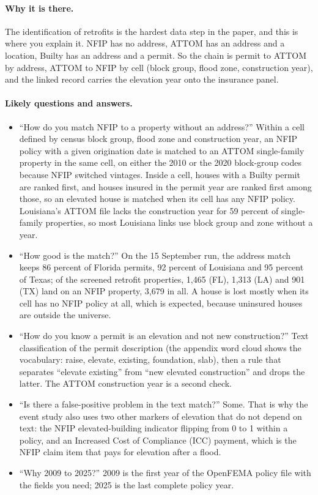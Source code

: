 \documentclass[11pt]{article}
\newcommand{\why}{\paragraph{Why it is there.}}
\newcommand{\qa}{\paragraph{Likely questions and answers.}}
\begin{document}
\why The identification of retrofits is the hardest data step in the paper, and this is where you explain it. NFIP has no address, ATTOM has an address and a location, Builty has an address and a permit. So the chain is permit to ATTOM by address, ATTOM to NFIP by cell (block group, flood zone, construction year), and the linked record carries the elevation year onto the insurance panel.

\qa
\begin{itemize}
\item ``How do you match NFIP to a property without an address?'' Within a cell defined by census block group, flood zone and construction year, an NFIP policy with a given origination date is matched to an ATTOM single-family property in the same cell, on either the 2010 or the 2020 block-group codes because NFIP switched vintages. Inside a cell, houses with a Builty permit are ranked first, and houses insured in the permit year are ranked first among those, so an elevated house is matched when its cell has any NFIP policy. Louisiana's ATTOM file lacks the construction year for 59 percent of single-family properties, so most Louisiana links use block group and zone without a year.
\item ``How good is the match?'' On the 15 September run, the address match keeps 86 percent of Florida permits, 92 percent of Louisiana and 95 percent of Texas; of the screened retrofit properties, 1,465 (FL), 1,313 (LA) and 901 (TX) land on an NFIP property, 3,679 in all. A house is lost mostly when its cell has no NFIP policy at all, which is expected, because uninsured houses are outside the universe.
\item ``How do you know a permit is an elevation and not new construction?'' Text classification of the permit description (the appendix word cloud shows the vocabulary: raise, elevate, existing, foundation, slab), then a rule that separates ``elevate existing'' from ``new elevated construction'' and drops the latter. The ATTOM construction year is a second check.
\item ``Is there a false-positive problem in the text match?'' Some. That is why the event study also uses two other markers of elevation that do not depend on text: the NFIP elevated-building indicator flipping from 0 to 1 within a policy, and an Increased Cost of Compliance (ICC) payment, which is the NFIP claim item that pays for elevation after a flood.
\item ``Why 2009 to 2025?'' 2009 is the first year of the OpenFEMA policy file with the fields you need; 2025 is the last complete policy year.
\end{itemize}
\end{document}
